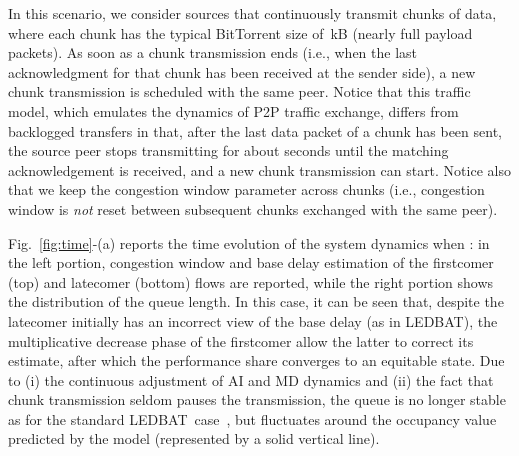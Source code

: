 \documentclass[conference]{IEEEtran}
\newcommand{\figR}[1]{Fig.~\ref{fig:#1}}
\newcommand{\figLC}[2]{
        \caption{#2}
        \label{fig:#1}
        \vspace{-5pt}
}
\newcommand{\btledbat}[0]{LEDBAT}
\newcommand{\fledbat}[0]{fLEDBAT}
\begin{document}
In this scenario, we consider sources that continuously transmit chunks of
data, where each chunk has the typical BitTorrent size of \,kB (nearly  full payload packets). As soon as a chunk transmission ends (i.e., when the last acknowledgment for that chunk has been received at the sender side), a new chunk transmission is scheduled with the same peer. Notice that this traffic model, which emulates the dynamics of P2P traffic exchange, differs from backlogged transfers in that,
after the last data packet of a chunk has been sent, the source peer stops transmitting for about  seconds until the matching acknowledgement is received, and a new chunk transmission can start. Notice also that we keep the congestion window parameter
across chunks (i.e., congestion window is \emph{not} reset between subsequent chunks exchanged with the same peer).



\figR{time}-(a) reports the time evolution of the system dynamics when : in the left portion, congestion window and base delay estimation of the firstcomer (top) and latecomer (bottom) flows are reported, while the right portion shows the  distribution of the queue length. In this case, it can be seen that, despite the latecomer initially has an incorrect view of the base delay (as in \btledbat), the multiplicative decrease phase of the firstcomer allow the latter to correct its estimate, after which the performance share converges to an equitable state. Due to (i) the continuous adjustment of AI and MD dynamics and (ii) the fact that chunk transmission seldom pauses the transmission, the queue is no longer stable as for the standard \btledbat\ case~\cite{icccn10}, but fluctuates around the occupancy value predicted by the model (represented by a solid vertical line).


\begin{figure*}[t]
    \begin{center}
       \figLC{sens}{Sensitivity analysis to : Efficiency, long-term fairness and protocol breakdown of a \fledbat\ flow sharing the bottleneck with (a) a TCP flow, (b) a \btledbat\ flow (c) another \fledbat\ flow.}
    \end{center}
\vspace{-4mm}
\end{figure*}
\end{document}

